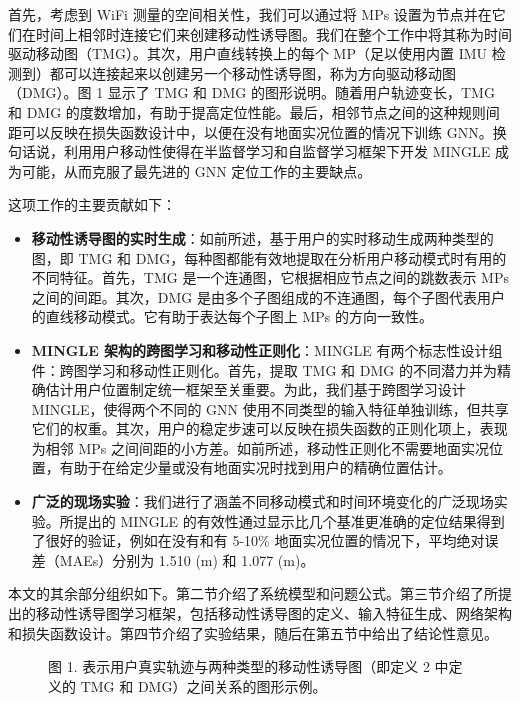 \documentclass[journal]{IEEEtran}
\begin{document}
首先，考虑到 WiFi 测量的空间相关性，我们可以通过将 MPs 设置为节点并在它们在时间上相邻时连接它们来创建移动性诱导图。我们在整个工作中将其称为时间驱动移动图（TMG）。其次，用户直线转换上的每个 MP（足以使用内置 IMU 检测到）都可以连接起来以创建另一个移动性诱导图，称为方向驱动移动图（DMG）。图 1 显示了 TMG 和 DMG 的图形说明。随着用户轨迹变长，TMG 和 DMG 的度数增加，有助于提高定位性能。最后，相邻节点之间的这种规则间距可以反映在损失函数设计中，以便在没有地面实况位置的情况下训练 GNN。换句话说，利用用户移动性使得在半监督学习和自监督学习框架下开发 MINGLE 成为可能，从而克服了最先进的 GNN 定位工作的主要缺点。

这项工作的主要贡献如下：
\begin{itemize}
    \item \textbf{移动性诱导图的实时生成}：如前所述，基于用户的实时移动生成两种类型的图，即 TMG 和 DMG，每种图都能有效地提取在分析用户移动模式时有用的不同特征。首先，TMG 是一个连通图，它根据相应节点之间的跳数表示 MPs 之间的间距。其次，DMG 是由多个子图组成的不连通图，每个子图代表用户的直线移动模式。它有助于表达每个子图上 MPs 的方向一致性。
    \item \textbf{MINGLE 架构的跨图学习和移动性正则化}：MINGLE 有两个标志性设计组件：跨图学习和移动性正则化。首先，提取 TMG 和 DMG 的不同潜力并为精确估计用户位置制定统一框架至关重要。为此，我们基于跨图学习设计 MINGLE，使得两个不同的 GNN 使用不同类型的输入特征单独训练，但共享它们的权重。其次，用户的稳定步速可以反映在损失函数的正则化项上，表现为相邻 MPs 之间间距的小方差。如前所述，移动性正则化不需要地面实况位置，有助于在给定少量或没有地面实况时找到用户的精确位置估计。
    \item \textbf{广泛的现场实验}：我们进行了涵盖不同移动模式和时间环境变化的广泛现场实验。所提出的 MINGLE 的有效性通过显示比几个基准更准确的定位结果得到了很好的验证，例如在没有和有 5-10\% 地面实况位置的情况下，平均绝对误差（MAEs）分别为 1.510 (m) 和 1.077 (m)。
\end{itemize}

本文的其余部分组织如下。第二节介绍了系统模型和问题公式。第三节介绍了所提出的移动性诱导图学习框架，包括移动性诱导图的定义、输入特征生成、网络架构和损失函数设计。第四节介绍了实验结果，随后在第五节中给出了结论性意见。

\begin{figure}[htbp]
\centering
\caption{图 1. 表示用户真实轨迹与两种类型的移动性诱导图（即定义 2 中定义的 TMG 和 DMG）之间关系的图形示例。}
\label{fig:1}
\end{figure}
\end{document}
